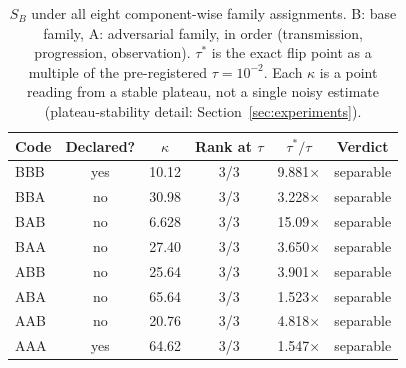 
\begin{table}[h]
  \centering
  \caption{$S_B$ under all eight component-wise family assignments. B: base family,
  A: adversarial family, in order (transmission, progression, observation). $\tau^*$ is the
  exact flip point as a multiple of the pre-registered $\tau=10^{-2}$. Each $\kappa$ is a point
  reading from a stable plateau, not a single noisy estimate (plateau-stability detail:
  Section~\ref{sec:experiments}).}
  \label{tab:sb-eight}
  \begin{tabular}{lccccc}
    \toprule
    Code & Declared? & $\kappa$ & Rank at $\tau$ & $\tau^*/\tau$ & Verdict \\
    \midrule
    BBB & yes & 10.12 & 3/3 & 9.881$\times$ & separable \\
    BBA & no  & 30.98 & 3/3 & 3.228$\times$ & separable \\
    BAB & no  & 6.628 & 3/3 & 15.09$\times$ & separable \\
    BAA & no  & 27.40 & 3/3 & 3.650$\times$ & separable \\
    ABB & no  & 25.64 & 3/3 & 3.901$\times$ & separable \\
    ABA & no  & 65.64 & 3/3 & 1.523$\times$ & separable \\
    AAB & no  & 20.76 & 3/3 & 4.818$\times$ & separable \\
    AAA & yes & 64.62 & 3/3 & 1.547$\times$ & separable \\
    \bottomrule
  \end{tabular}
\end{table}

